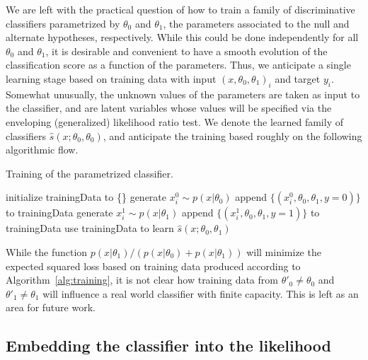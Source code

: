 \documentclass[aoas,preprint]{imsart}
\numberwithin{equation}{section}
\theoremstyle{plain}
\begin{document}
We are left with the practical question of how to train a family of discriminative classifiers parametrized by $\theta_0$ and $\theta_1$, the 
parameters associated to the null and alternate hypotheses, respectively. While this could be done independently
for all $\theta_0$ and $\theta_1$, it is desirable and convenient to have a smooth evolution of the classification score as a function of the parameters. Thus, we anticipate a single learning stage based on training data with input $(x, \theta_0, \theta_1)_i$ and target $y_i$. Somewhat unusually, the unknown values of the parameters are taken
as input to the classifier, and are latent variables whose values will be specified via the enveloping (generalized) likelihood ratio test. We denote the learned family of classifiers $\hat{s}(x; \theta_0, \theta_0)$, and anticipate the training based roughly on the following algorithmic flow.
\begin{algorithm}[ht]
\caption{Training of the parametrized classifier.}\label{alg:training}
\begin{algorithmic}
\STATE initialize trainingData to \{\}
		\STATE generate $x_i^0 \sim p(x|\theta_0)$
		\STATE append $\{ (x_i^0, \theta_0, \theta_1, y=0) \}$ to trainingData
		\STATE generate $x_i^1 \sim p(x|\theta_1)$
		\STATE append $\{ (x_i^1, \theta_0, \theta_1, y=1) \}$ to trainingData
	\ENDFOR
\ENDFOR
\STATE use trainingData to learn $\hat{s}(x; \theta_0, \theta_1)$
\end{algorithmic}
\end{algorithm}%

While the function $p(x|\theta_1)/(p(x|\theta_0)+p(x|\theta_1))$ will minimize the expected squared loss based on 
training data produced according to Algorithm~\ref{alg:training}, it is not clear how training data from $\theta'_0 \ne \theta_0$ and $\theta'_1 \ne \theta_1$ will influence a real world classifier with finite capacity. This is left as an area for future work.

\subsection{Embedding the classifier into the likelihood}
\end{document}
